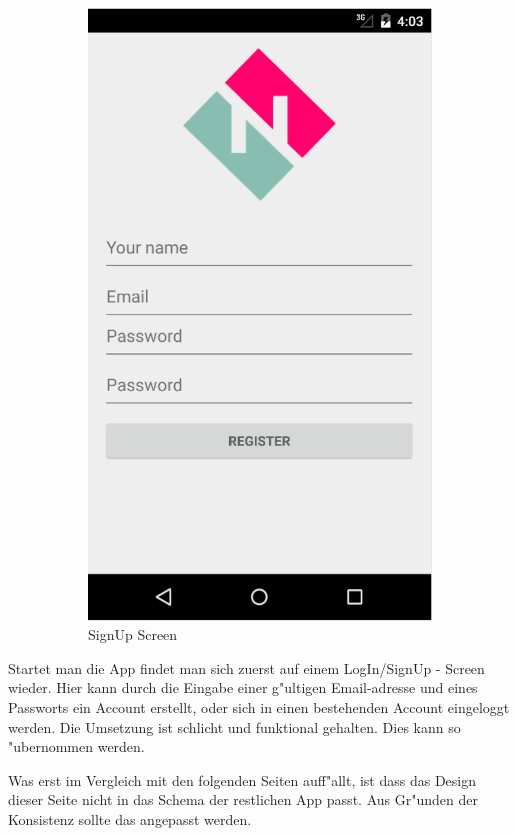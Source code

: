 \begin{figure}[H]
\begin{subfigure}{0.5\textwidth}
\includegraphics[width=0.9\linewidth]{./Bilder/signUp.png}
\caption{SignUp Screen}
\label{fig:signin}
\end{subfigure}
\caption{}
\label{fig:image2}
\end{figure}

Startet man die App findet man sich zuerst auf einem LogIn/SignUp - Screen wieder. 
Hier kann durch die Eingabe einer g"ultigen Email-adresse und eines Passworts ein Account erstellt, oder sich in einen bestehenden Account eingeloggt werden. 
Die Umsetzung ist schlicht und funktional gehalten. 
Dies kann so "ubernommen werden. 
 
Was erst im Vergleich mit den folgenden Seiten auff"allt, ist dass das Design dieser Seite nicht in das Schema der restlichen App passt. 
Aus Gr"unden der Konsistenz sollte das angepasst werden.

